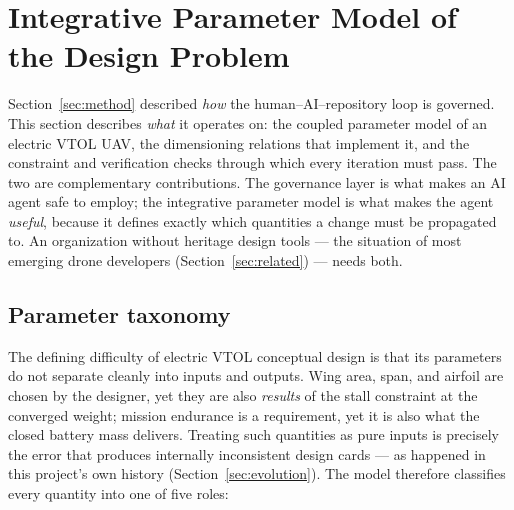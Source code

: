 \section{Integrative Parameter Model of the Design Problem}
\label{sec:model}

Section~\ref{sec:method} described \emph{how} the human--AI--repository
loop is governed. This section describes \emph{what} it operates on:
the coupled parameter model of an electric VTOL UAV, the dimensioning
relations that implement it, and the constraint and verification checks
through which every iteration must pass. The two are complementary
contributions. The governance layer is what makes an AI agent safe to
employ; the integrative parameter model is what makes the agent
\emph{useful}, because it defines exactly which quantities a change
must be propagated to. An organization without heritage design tools
--- the situation of most emerging drone developers
(Section~\ref{sec:related}) --- needs both.

\subsection{Parameter taxonomy}
\label{sec:taxonomy}

The defining difficulty of electric VTOL conceptual design is that its
parameters do not separate cleanly into inputs and outputs. Wing area,
span, and airfoil are chosen by the designer, yet they are also
\emph{results} of the stall constraint at the converged weight; mission
endurance is a requirement, yet it is also what the closed battery mass
delivers. Treating such quantities as pure inputs is precisely the
error that produces internally inconsistent design cards --- as
happened in this project's own history (Section~\ref{sec:evolution}).
The model therefore classifies every quantity into one of five roles:

